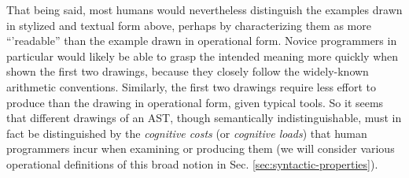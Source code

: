 That being said, most humans would nevertheless distinguish the examples drawn in stylized and textual form above, perhaps by characterizing them as more ``'readable'' than the example drawn in operational form. Novice programmers in particular would likely be able to grasp the intended meaning more quickly when shown the first two drawings, because they closely follow the widely-known arithmetic conventions. Similarly, the first two drawings  require less effort to produce than the drawing in operational form, given typical tools. %
So it seems that different drawings of an AST, though semantically indistinguishable, must in fact be distinguished by the \emph{cognitive costs} (or \emph{cognitive loads}) that human programmers incur when examining or producing them (we will consider various operational definitions of this broad notion in Sec. \ref{sec:syntactic-properties}). %

